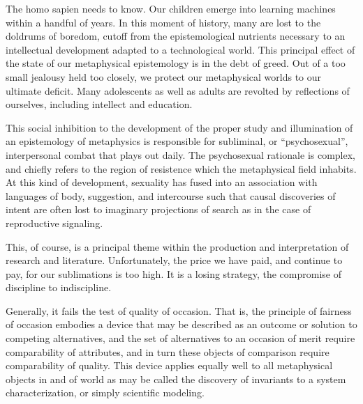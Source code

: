 


﻿The homo sapien needs to know.  Our children emerge into learning
machines within a handful of years.  In this moment of history, many
are lost to the doldrums of boredom, cutoff from the epistemological
nutrients necessary to an intellectual development adapted to a
technological world.  This principal effect of the state of our
metaphysical epistemology is in the debt of greed.  Out of a too small
jealousy held too closely, we protect our metaphysical worlds to our
ultimate deficit.  Many adolescents as well as adults are revolted by
reflections of ourselves, including intellect and education.

This social inhibition to the development of the proper study and
illumination of an epistemology of metaphysics is responsible for
subliminal, or ``psychosexual'', interpersonal combat that plays out
daily.  The psychosexual rationale is complex, and chiefly refers to
the region of resistence which the metaphysical field inhabits.  At
this kind of development, sexuality has fused into an association with
languages of body, suggestion, and intercourse such that causal
discoveries of intent are often lost to imaginary projections of
search as in the case of reproductive signaling.

This, of course, is a principal theme within the production and
interpretation of research and literature.  Unfortunately, the price
we have paid, and continue to pay, for our sublimations is too high.
It is a losing strategy, the compromise of discipline to indiscipline.

Generally, it fails the test of quality of occasion.  That is, the
principle of fairness of occasion embodies a device that may be
described as an outcome or solution to competing alternatives, and the
set of alternatives to an occasion of merit require comparability of
attributes, and in turn these objects of comparison require
comparability of quality.  This device applies equally well to all
metaphysical objects in and of world as may be called the discovery of
invariants to a system characterization, or simply scientific
modeling.

\bye
